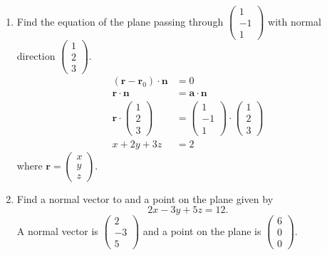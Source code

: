 \begin{example}
    \begin{enumerate}
        \item Find the equation of the plane passing through
        $\begin{pmatrix}
            1\\-1\\1
        \end{pmatrix}$
        with normal direction
        $\begin{pmatrix}
            1\\2\\3
        \end{pmatrix}$.
        \begin{align*}
            (\bm r-\bm r_0)\cdot\bm n&=0\\
            \bm r\cdot \bm n&=\bm a\cdot\bm n\\
            \bm r
            \cdot
            \begin{pmatrix}
                1\\2\\3
            \end{pmatrix}
            &=
            \begin{pmatrix}
                1\\-1\\1
            \end{pmatrix}
            \cdot
            \begin{pmatrix}
                1\\2\\3
            \end{pmatrix}
            \\
            x+2y+3z&=2
        \end{align*}
        where 
        $
            \bm r=
            \begin{pmatrix}
                x\\y\\z
            \end{pmatrix}
            .
        $
        
        
        \item Find a normal vector to and a point on the plane given by
        \[2x-3y+5z=12.\]
        A normal vector is
        $
            \begin{pmatrix}
                2\\-3\\5
            \end{pmatrix}
        $
        and a point on the plane is
        $
            \begin{pmatrix}
                6\\0\\0
            \end{pmatrix}
            .
        $
        

\end{enumerate}
\end{example}
